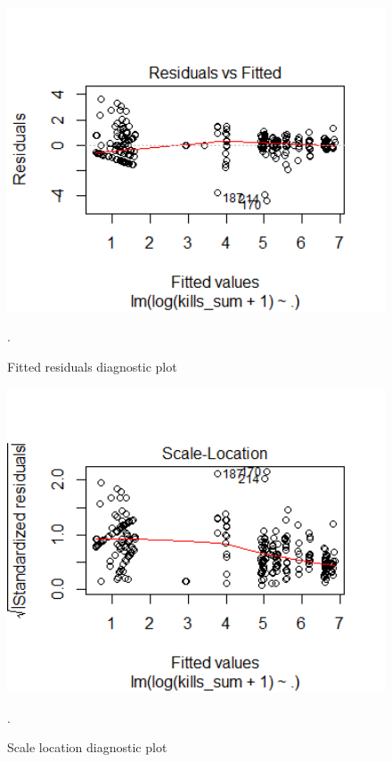 \begin{figure}[t]
\includegraphics[width=15cm]{Peters_experiment_markdown_files/figure-latex/Rplot03_residuals_fitted.png}
\caption{Fitted residuals diagnostic plot}.
\label{fig:residualsdiag}
\centering
\end{figure}

\begin{figure}[t]
\includegraphics[width=15cm]{Peters_experiment_markdown_files/figure-latex/Rplot02_scale_location.png}
\caption{Scale location diagnostic plot}.
\label{fig:scalelocationdiag}
\centering
\end{figure}

